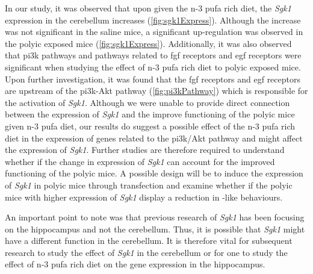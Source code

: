 In our study, it was observed that upon given the n-3 \gls{pufa} rich diet, the \textit{Sgk1} expression in the cerebellum increases (\cref{fig:sgk1Express}).
Although the increase was not significant in the saline mice, a significant up-regulation was observed in the \gls{polyic} exposed mice (\cref{fig:sgk1Express}). 
Additionally, it was also observed that \gls{pi3k} pathways and pathways related to \gls{fgf} receptors and \gls{egf} receptors were significant when studying the effect of n-3 \gls{pufa} rich diet to \gls{polyic} exposed mice.
Upon further investigation, it was found that the \gls{fgf} receptors and \gls{egf} receptors are upstream of the \gls{pi3k}-Akt pathway (\cref{fig:pi3kPathway}) which is responsible for the activation of \textit{Sgk1}.
Although we were unable to provide direct connection between the expression of \textit{Sgk1} and the improve functioning of the \gls{polyic} mice given n-3 \gls{pufa} diet, our results do suggest a possible effect of the n-3 \gls{pufa} rich diet in the expression of genes related to the \gls{pi3k}/Akt pathway and might affect the expression of \textit{Sgk1}.
Further studies are therefore required to understand whether if the change in expression of \textit{Sgk1} can account for the improved functioning of the \gls{polyic} mice. 
A possible design will be to induce the expression of \textit{Sgk1} in \gls{polyic} mice through transfection and examine whether if the \gls{polyic} mice with higher expression of \textit{Sgk1} display a reduction in -like behaviours.

An important point to note was that previous research of \textit{Sgk1} has been focusing on the hippocampus and not the cerebellum. 
Thus, it is possible that \textit{Sgk1} might have a different function in the cerebellum. 
It is therefore vital for subsequent research to study the effect of \textit{Sgk1} in the cerebellum or for one to study the effect of n-3 \gls{pufa} rich diet on the gene expression in the hippocampus. 

